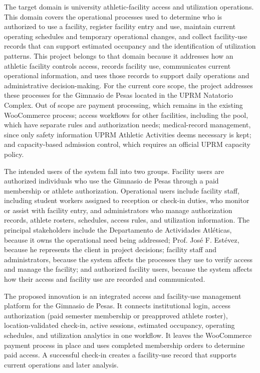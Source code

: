 \documentclass[11pt,letterpaper]{article}
\begin{document}
The target domain is university athletic-facility access and utilization operations. This domain covers the operational processes used to determine who is authorized to use a facility, register facility entry and use, maintain current operating schedules and temporary operational changes, and collect facility-use records that can support estimated occupancy and the identification of utilization patterns. This project belongs to that domain because it addresses how an athletic facility controls access, records facility use, communicates current operational information, and uses those records to support daily operations and administrative decision-making. For the current core scope, the project addresses these processes for the Gimnasio de Pesas located in the UPRM Natatorio Complex. Out of scope are payment processing, which remains in the existing WooCommerce process; access workflows for other facilities, including the pool, which have separate rules and authorization needs; medical-record management, since only safety information UPRM Athletic Activities deems necessary is kept; and capacity-based admission control, which requires an official UPRM capacity policy.

The intended users of the system fall into two groups. Facility users are authorized individuals who use the Gimnasio de Pesas through a paid membership or athlete authorization. Operational users include facility staff, including student workers assigned to reception or check-in duties, who monitor or assist with facility entry, and administrators who manage authorization records, athlete rosters, schedules, access rules, and utilization information. The principal stakeholders include the Departamento de Actividades Atléticas, because it owns the operational need being addressed; Prof. José F. Estévez, because he represents the client in project decisions; facility staff and administrators, because the system affects the processes they use to verify access and manage the facility; and authorized facility users, because the system affects how their access and facility use are recorded and communicated.

The proposed innovation is an integrated access and facility-use management platform for the Gimnasio de Pesas. It connects institutional login, access authorization (paid semester membership or preapproved athlete roster), location-validated check-in, active sessions, estimated occupancy, operating schedules, and utilization analytics in one workflow. It leaves the WooCommerce payment process in place and uses completed membership orders to determine paid access. A successful check-in creates a facility-use record that supports current operations and later analysis.
\end{document}
